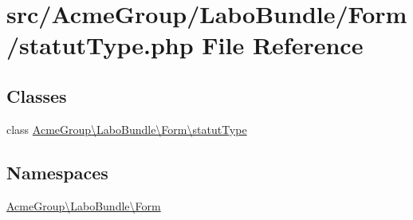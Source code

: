 \hypertarget{statut_type_8php}{\section{src/\+Acme\+Group/\+Labo\+Bundle/\+Form/statut\+Type.php File Reference}
\label{statut_type_8php}
}
\subsection*{Classes}
\begin{DoxyCompactItemize}
\item 
class \hyperlink{class_acme_group_1_1_labo_bundle_1_1_form_1_1statut_type}{Acme\+Group\textbackslash{}\+Labo\+Bundle\textbackslash{}\+Form\textbackslash{}statut\+Type}
\end{DoxyCompactItemize}
\subsection*{Namespaces}
\begin{DoxyCompactItemize}
\item 
 \hyperlink{namespace_acme_group_1_1_labo_bundle_1_1_form}{Acme\+Group\textbackslash{}\+Labo\+Bundle\textbackslash{}\+Form}
\end{DoxyCompactItemize}

